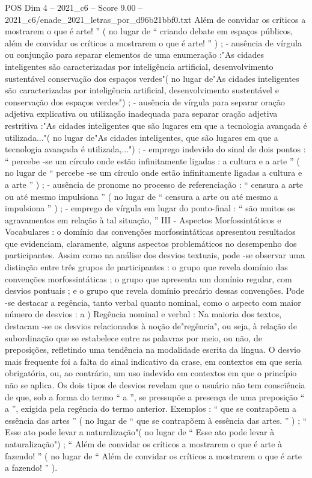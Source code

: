 \begin{textsample}{POS Dim 4 – 2021\_c6 – Score 9.00 – 2021\_c6/enade\_2021\_letras\_por\_d96b21bbf0.txt}
Além de convidar os críticos a mostrarem o que é arte! ” ( no lugar de “ criando debate em espaços públicos, além de convidar os críticos a mostrarem o que é arte! ” ) ; - ausência de vírgula ou conjunção para separar elementos de uma enumeração :"As cidades inteligentes são caracterizadas por inteligência artificial, desenvolvimento sustentável conservação dos espaços verdes"( no lugar de"As cidades inteligentes são caracterizadas por inteligência artificial, desenvolvimento sustentável e conservação dos espaços verdes") ; - ausência de vírgula para separar oração adjetiva explicativa ou utilização inadequada para separar oração adjetiva restritiva :"As cidades inteligentes que são lugares em que a tecnologia avançada é utilizada..."( no lugar de"As cidades inteligentes, que são lugares em que a tecnologia avançada é utilizada,...") ; - emprego indevido do sinal de dois pontos : “ percebe -se um círculo onde estão infinitamente ligadas : a cultura e a arte ” ( no lugar de “ percebe -se um círculo onde estão infinitamente ligadas a cultura e a arte ” ) ; - ausência de pronome no processo de referenciação : “ censura a arte ou até mesmo impulsiona ” ( no lugar de “ censura a arte ou até mesmo a impulsiona ” ) ; - emprego de vírgula em lugar do ponto-final : “ são muitos os agravamentos em relação à tal situação, ” III - Aspectos Morfossintáticos e Vocabulares : o domínio das convenções morfossintáticas apresentou resultados que evidenciam, claramente, alguns aspectos problemáticos no desempenho dos participantes.
Assim como na análise dos desvios textuais, pode -se observar uma distinção entre três grupos de participantes : o grupo que revela domínio das convenções morfossintáticas ; o grupo que apresenta um domínio regular, com desvios pontuais ; e o grupo que revela domínio precário dessas convenções.
Pode -se destacar a regência, tanto verbal quanto nominal, como o aspecto com maior número de desvios : a ) Regência nominal e verbal : Na maioria dos textos, destacam -se os desvios relacionados à noção de"regência", ou seja, à relação de subordinação que se estabelece entre as palavras por meio, ou não, de preposições, refletindo uma tendência na modalidade escrita da língua.
O desvio mais frequente foi a falta do sinal indicativo da crase, em contextos em que seria obrigatória, ou, ao contrário, um uso indevido em contextos em que o princípio não se aplica.
Os dois tipos de desvios revelam que o usuário não tem consciência de que, sob a forma do termo “ a ”, se pressupõe a presença de uma preposição “ a ”, exigida pela regência do termo anterior.
Exemplos : “ que se contrapõem a essência das artes ” ( no lugar de “ que se contrapõem à essência das artes. ” ) ; “ Esse ato pode levar a naturalização"( no lugar de “ Esse ato pode levar à naturalização") ; “ Além de convidar os críticos a mostrarem o que é arte à fazendo! ” ( no lugar de “ Além de convidar os críticos a mostrarem o que é arte a fazendo! ” ).

\end{textsample}
